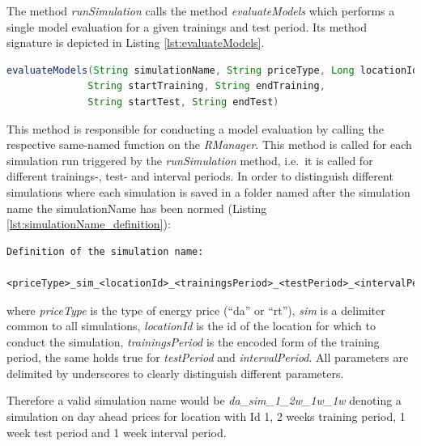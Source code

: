 The method \textit{runSimulation} calls the method \textit{evaluateModels} which performs a single model evaluation for a given trainings and test period. Its method signature is depicted in Listing \ref{lst:evaluateModels}. 

\begin{minipage}{\linewidth}
\begin{lstlisting}[language=Java, caption=Method evaluateModels, label={lst:evaluateModels}]
evaluateModels(String simulationName, String priceType, Long locationId, 
              String startTraining, String endTraining,
              String startTest, String endTest)
\end{lstlisting}
\end{minipage}

This method is responsible for conducting a model evaluation by calling the respective same-named function on the \textit{RManager}. This method is called for each simulation run triggered by the \textit{runSimulation} method, i.e.~it is called for different trainings-, test- and interval periods. In order to distinguish different simulations where each simulation is saved in a folder named after the simulation name the simulationName has been normed (Listing \ref{lst:simulationName_definition}): 

\begin{minipage}{\linewidth}
\begin{lstlisting}[caption=Definition of the simulation name, label={lst:simulationName_definition}]
Definition of the simulation name: 
	
<priceType>_sim_<locationId>_<trainingsPeriod>_<testPeriod>_<intervalPeriod>
\end{lstlisting}
\end{minipage}

where \textit{priceType} is the type of energy price (``da'' or ``rt''), \textit{sim} is a delimiter common to all simulations, \textit{locationId} is the id of the location for which to conduct the simulation, \textit{trainingsPeriod} is the encoded form of the training period, the same holds true for \textit{testPeriod} and \textit{intervalPeriod}. All parameters are delimited by underscores to clearly distinguish different parameters. 

Therefore a valid simulation name would be \textit{da\_sim\_1\_2w\_1w\_1w} denoting a simulation on day ahead prices for location with Id 1, 2 weeks training period, 1 week test period and 1 week interval period. 

